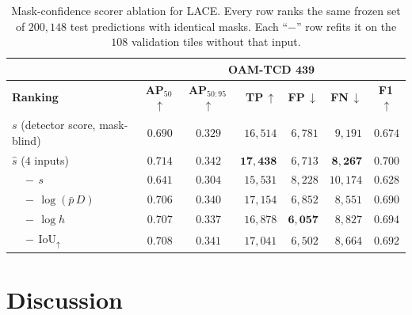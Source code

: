 \documentclass[remotesensing,article,submit,moreauthors]{Definitions/mdpi}
\begin{document}
\begin{table}[H]
\caption{Mask-confidence scorer ablation for LACE. Every row ranks the same frozen set of $200{,}148$ test predictions with identical masks. Each ``$-$'' row refits it on the $108$ validation tiles without that input.}
\label{tab:factors}
\setlength{\tabcolsep}{3pt}
\begin{tabularx}{\textwidth}{@{}>{\raggedright\arraybackslash}X c c r r r c@{}}
\toprule
 & \multicolumn{6}{c}{\textbf{OAM-TCD $\mathbf{439}$}} \\
\cmidrule(l){2-7}
\textbf{Ranking} & \textbf{AP\boldmath$_{50}$}\,$\uparrow$ & \textbf{AP\boldmath$_{50:95}$}\,$\uparrow$ & \textbf{TP}\,$\uparrow$ & \textbf{FP}\,$\downarrow$ & \textbf{FN}\,$\downarrow$ & \textbf{F1}\,$\uparrow$ \\
\midrule
$s$ (detector score, mask-blind)            & $0.690$ & $0.329$ & $16{,}514$ & $6{,}781$ & $9{,}191$ & $0.674$ \\
\addlinespace[2pt]
$\hat s$ ($4$ inputs)           & $\mathbf{0.714}$ & $\mathbf{0.342}$ & $\mathbf{17{,}438}$ & $6{,}713$ & $\mathbf{8{,}267}$ & $\mathbf{0.700}$ \\
$\quad -\, s$                   & $0.641$ & $0.304$ & $15{,}531$ & $8{,}228$ & $10{,}174$ & $0.628$ \\
$\quad -\, \log(\bar p\,D)$     & $0.706$ & $0.340$ & $17{,}154$ & $6{,}852$ & $8{,}551$ & $0.690$ \\
$\quad -\, \log h$      & $0.707$ & $0.337$ & $16{,}878$ & $\mathbf{6{,}057}$ & $8{,}827$ & $0.694$ \\
$\quad -\, \mathrm{IoU}_{\uparrow}$       & $0.708$ & $0.341$ & $17{,}041$ & $6{,}502$ & $8{,}664$ & $0.692$ \\
\bottomrule
\end{tabularx}
\end{table}


\section{Discussion}
\label{sec:discussion}
\end{document}
